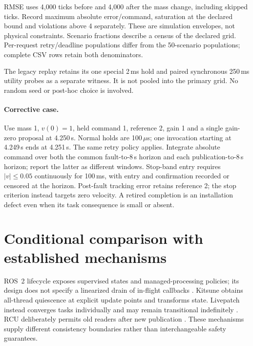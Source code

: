 RMSE uses 4,000 ticks before and 4,000 after the mass change, including skipped ticks. Record maximum absolute error/command, saturation at the declared bound and violations above 4 separately. These are simulation envelopes, not physical constraints. Scenario fractions describe a census of the declared grid. Per-request retry/deadline populations differ from the 50-scenario populations; complete CSV rows retain both denominators.

The legacy replay retains its one special 2\,ms hold and paired synchronous 250\,ms utility probes as a separate witness. It is not pooled into the primary grid. No random seed or post-hoc choice is involved.

\paragraph{Corrective case.}
Use mass 1, $v(0)=1$, held command 1, reference 2, gain 1 and a single gain-zero proposal at 4.250\,s. Normal holds are 100\,$\mu$s; one invocation starting at 4.249\,s ends at 4.251\,s. The same retry policy applies. Integrate absolute command over both the common fault-to-8\,s horizon and each publication-to-8\,s horizon; report the latter as different windows. Stop-band entry requires $|v|\leq0.05$ continuously for 100\,ms, with entry and confirmation recorded or censored at the horizon. Post-fault tracking error retains reference 2; the stop criterion instead targets zero velocity. A retired completion is an installation defect even when its task consequence is small or absent.

\section{Conditional comparison with established mechanisms}
\label{app:related}
ROS~2 lifecycle exposes supervised states and managed-processing policies; its design does not specify a linearized drain of in-flight callbacks \citep{ros2lifecycle}. Kitsune obtains all-thread quiescence at explicit update points and transforms state. Livepatch instead converges tasks individually and may remain transitional indefinitely \citep{hayden2014kitsune,linuxlivepatch}. RCU deliberately permits old readers after new publication \citep{linuxrcu}. These mechanisms supply different consistency boundaries rather than interchangeable safety guarantees.

